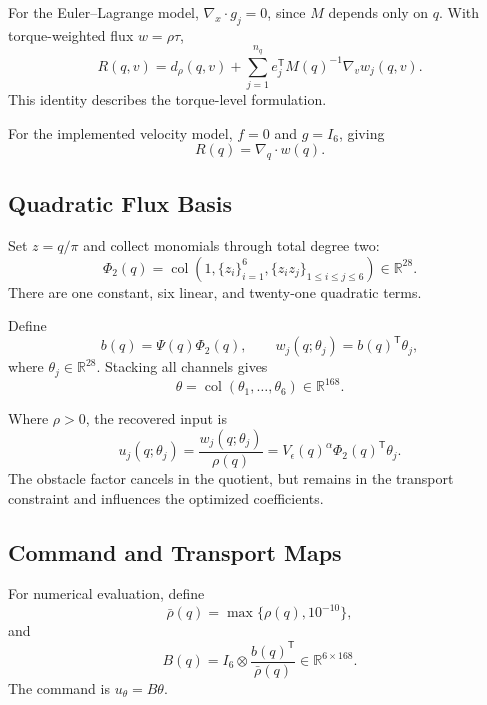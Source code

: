 \documentclass[conference]{IEEEtran}
\newcommand{\R}{\mathbb{R}}
\newcommand{\trans}{^{\mathsf T}}
\DeclareMathOperator{\col}{col}
\begin{document}
For the Euler--Lagrange model,
$\nabla_x\cdot g_j=0$, since $M$ depends only
on $q$. With torque-weighted flux $w=\rho\tau$,
\begin{equation}
    R(q,v)=d_\rho(q,v)
    +\sum_{j=1}^{n_q}
    e_j\trans M(q)^{-1}\nabla_vw_j(q,v).
\end{equation}
This identity describes the torque-level formulation.

For the implemented velocity model,
$f=0$ and $g=I_6$, giving
\begin{equation}
    R(q)=\nabla_q\cdot w(q).
\end{equation}

\subsection{Quadratic Flux Basis}

Set $z=q/\pi$ and collect monomials through
total degree two:
\begin{equation}
    \Phi_2(q)=
    \col\left(
        1,\{z_i\}_{i=1}^{6},
        \{z_i z_j\}_{1\leq i\leq j\leq6}
    \right)
    \in\R^{28}.
\end{equation}
There are one constant, six linear,
and twenty-one quadratic terms.

Define
\begin{equation}
    b(q)=\Psi(q)\Phi_2(q),\qquad
    w_j(q;\theta_j)=b(q)\trans\theta_j,
\end{equation}
where $\theta_j\in\R^{28}$.
Stacking all channels gives
\begin{equation}
    \theta=\col(\theta_1,\ldots,\theta_6)\in\R^{168}.
\end{equation}

Where $\rho>0$, the recovered input is
\begin{equation}
    u_j(q;\theta_j)
    =
    \frac{w_j(q;\theta_j)}{\rho(q)}
    =
    V_\epsilon(q)^\alpha
    \Phi_2(q)\trans\theta_j.
\end{equation}
The obstacle factor cancels in the quotient,
but remains in the transport constraint and
influences the optimized coefficients.

\subsection{Command and Transport Maps}

For numerical evaluation, define
\begin{equation}
    \bar\rho(q)=\max\{\rho(q),10^{-10}\},
\end{equation}
and
\begin{equation}
    B(q)=I_6\otimes
    \frac{b(q)\trans}{\bar\rho(q)}
    \in\R^{6\times168}.
\end{equation}
The command is $u_\theta=B\theta$.
\end{document}
